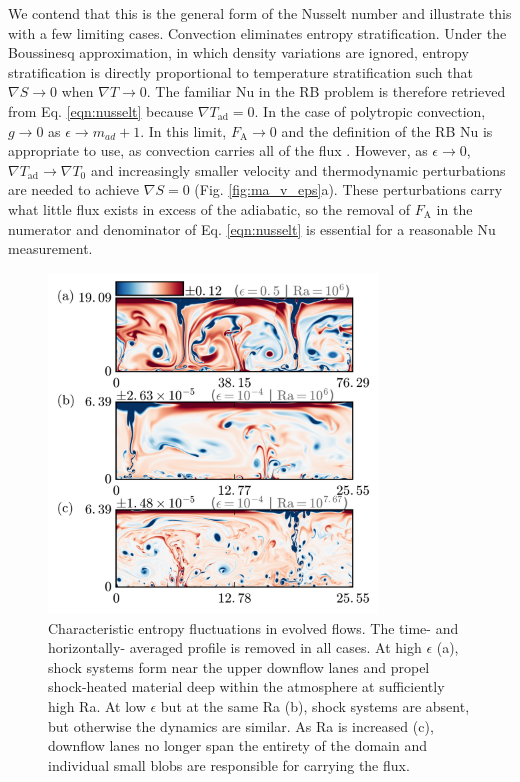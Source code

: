 \documentclass[aps, prl, twocolumn, nofootinbib, groupedaddress, amsfonts, amssymb, amsmath]{revtex4-1}
\newcommand{\grad}{\ensuremath{\nabla}}
\begin{document}
We contend that this is the general form of the Nusselt number and illustrate this with a few limiting
cases. Convection eliminates
entropy stratification.  Under the Boussinesq approximation,
in which density variations are ignored, entropy stratification is directly proportional to temperature stratification
such that $\grad S \rightarrow 0$ when $\grad T \rightarrow 0$.  The familiar Nu in the RB problem is
therefore retrieved from Eq. \ref{eqn:nusselt} because $\grad T_{\text{ad}} = 0$.  
In the case of polytropic convection,  $g \rightarrow 0$
as $\epsilon \rightarrow m_{ad} + 1$.
In this limit, $F_{\text{A}} \rightarrow 0$ and the
definition of the RB Nu is appropriate to use, as convection carries all of the
flux \cite{brandenburg&all2005}. 
However, as $\epsilon \rightarrow 0$, 
$\grad T_{\text{ad}}\rightarrow \grad T_0$ and increasingly
smaller velocity and thermodynamic perturbations are needed to achieve $\grad S = 0$ (Fig. \ref{fig:ma_v_eps}a).
These perturbations carry what little flux exists in excess of the adiabatic, so the removal of 
$F_{\text{A}}$ in the numerator and denominator of Eq. \ref{eqn:nusselt} is essential for a reasonable Nu measurement.

\begin{figure}[b]
\includegraphics[width=3.4375in]{./figs/snapshots_fig.png}
\caption{Characteristic entropy fluctuations in evolved flows. The time- and horizontally-
averaged profile is removed in all cases.  At high
$\epsilon$ (a), shock systems form near the upper downflow lanes and propel shock-heated material deep within
the atmosphere at sufficiently high Ra.  At low $\epsilon$ but at the same Ra (b), shock systems are absent, 
but otherwise the dynamics are similar.  As Ra is increased (c), downflow lanes no longer span
the entirety of the domain and individual small blobs are responsible for carrying the flux.
\label{fig:entropy_snapshots} }
\end{figure}
\end{document}
